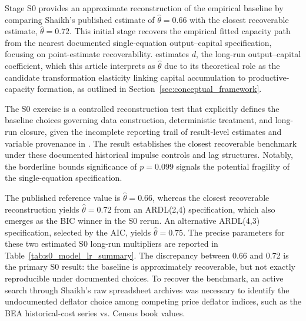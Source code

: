 \documentclass[11pt]{article}
\begin{document}
Stage S0 provides an approximate reconstruction of the empirical baseline by comparing Shaikh's published estimate of $\hat{\theta}=0.66$ with the closest recoverable estimate, $\hat{\theta}=0.72$. This initial stage recovers the empirical fitted capacity path from the nearest documented single-equation output--capital specification, focusing on point-estimate recoverability. \citet{Shaikh2016} estimates $d$, the long-run output--capital coefficient, which this article interprets as $\hat{\theta}$ due to its theoretical role as the candidate transformation elasticity linking capital accumulation to productive-capacity formation, as outlined in Section~\ref{sec:conceptual_framework}.

The S0 exercise is a controlled reconstruction test that explicitly defines the baseline choices governing data construction, deterministic treatment, and long-run closure, given the incomplete reporting trail of result-level estimates and variable provenance in \citet{Shaikh2016}. The result establishes the closest recoverable benchmark under these documented historical impulse controls and lag structures. Notably, the borderline bounds significance of $p=0.099$ signals the potential fragility of the single-equation specification.

The published reference value is $\hat{\theta}=0.66$, whereas the closest recoverable reconstruction yields $\hat{\theta}=0.72$ from an ARDL(2,4) specification, which also emerges as the BIC winner in the S0 rerun. An alternative ARDL(4,3) specification, selected by the AIC, yields $\hat{\theta}=0.75$. The precise parameters for these two estimated S0 long-run multipliers are reported in Table~\ref{tab:s0_model_lr_summary}. The discrepancy between 0.66 and 0.72 is the primary S0 result: the baseline is approximately recoverable, but not exactly reproducible under documented choices. To recover the benchmark, an active search through Shaikh's raw spreadsheet archives was necessary to identify the undocumented deflator choice among competing price deflator indices, such as the BEA historical-cost series vs. Census book values.
\end{document}
